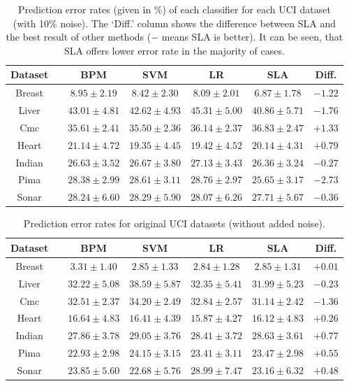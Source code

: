 \begin{table}[htbp!]
\centering
\begin{tabular}{|cc|  ccc|c|c|}
\hline\hline
{\bf Dataset} && {\bf BPM} & {\bf SVM} & {\bf LR} & {\bf SLA} & {\bf Diff.}\\  
\hline
Breast && $8.95 \pm 2.19$ & $8.42 \pm 2.30$ & $8.09 \pm 2.01$ & $6.87 \pm 1.78$ & $-1.22$\\  
Liver && $43.01 \pm 4.81$ & $42.62 \pm 4.93$ & $45.31 \pm 5.00$ & $40.86 \pm 5.71$ & $-1.76$\\  
Cmc && $35.61 \pm 2.41$ & $35.50 \pm 2.36$ & $36.14 \pm 2.37$ & $36.83 \pm 2.47$ & $+1.33$\\  
Heart && $21.14 \pm 4.72$ & $19.35 \pm 4.45$ & $19.42 \pm 4.52$ & $20.14 \pm 4.31$ & $+0.79$\\  
Indian && $26.63 \pm 3.52$ & $26.67 \pm 3.80$ & $27.13 \pm 3.43$ & $26.36 \pm 3.24$ & $-0.27$\\  
Pima && $28.38 \pm 2.99$ & $28.61 \pm 3.11$ & $28.76 \pm 2.97$ & $25.65 \pm 3.17$ & $-2.73$\\  
Sonar && $28.24 \pm 6.60$ & $28.29 \pm 5.90$ & $28.07 \pm 6.26$ & $27.71 \pm 5.67$ & $-0.36$\\[1ex]   
\hline\hline
\end{tabular}
\caption{Prediction error rates (given in \%) of each classifier for each UCI dataset (with 10\% noise). The `Diff.' column shows the difference between SLA and the best result of other methods ($-$ means SLA is better). It can be seen, that SLA offers lower error rate in the majority of cases.} 
\label{tab:ucierrorrates}
\end{table}

\begin{table}[htbp!]
\centering
\begin{tabular}{|cc|  ccc|c|c|}
\hline\hline
{\bf Dataset} && {\bf BPM} & {\bf SVM} & {\bf LR} & {\bf SLA} & {\bf Diff.}\\    
\hline
Breast && $3.31 \pm 1.40$ & $2.85 \pm 1.33$ & $2.84 \pm 1.28$ & $2.85 \pm 1.31$ & $+0.01$\\  
Liver && $32.22 \pm 5.08$ & $38.59 \pm 5.87$ & $32.35 \pm 5.41$ & $31.99 \pm 5.23$ & $-0.23$\\  
Cmc && $32.51 \pm 2.37$ & $34.20 \pm 2.49$ & $32.84 \pm 2.57$ & $31.14 \pm 2.42$ & $-1.36$\\  
Heart && $16.64 \pm 4.83$ & $16.41 \pm 4.39$ & $15.87 \pm 4.27$ & $16.12 \pm 4.83$ & $+0.26$\\  
Indian && $27.86 \pm 3.78$ & $29.05 \pm 3.76$ & $28.41 \pm 3.72$ & $28.63 \pm 3.61$ & $+0.77$\\  
Pima && $22.93 \pm 2.98$ & $24.15 \pm 3.15$ & $23.41 \pm 3.11$ & $23.47 \pm 2.98$ & $+0.55$\\  
Sonar && $23.85 \pm 5.60$ & $22.68 \pm 5.76$ & $28.99 \pm 7.47$ & $23.16 \pm 6.32$ & $+0.48$\\[1ex]   
\hline\hline
\end{tabular}
\caption{Prediction error rates for original UCI datasets (without added noise).} 
\label{tab:ucierrorrates2}
\end{table}


